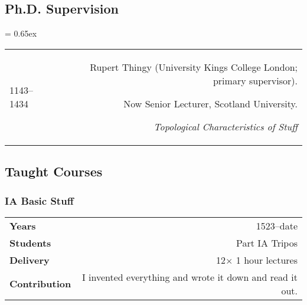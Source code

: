 \subsection{Ph.D. Supervision}

{
  \tabulinesep = 0.65ex

  \begin{longtabu} to 

      1143--1434 & Rupert Thingy (University Kings College London; primary supervisor).
      \par Now Senior Lecturer, Scotland University.
      \par\it Topological Characteristics of Stuff\\

    \end{longtabu}
  }

\subsection{Taught Courses}

\subsubsection{IA Basic Stuff}
\begin{longtabu} to 
  {\bf Years}
  & 1523--date\\

  {\bf Students}
  & Part IA Tripos\\

  {\bf Delivery}
  & 12$\times$ 1 hour lectures \\

  {\bf Contribution}
  & I invented everything and wrote it down and read it out. \\
\end{longtabu}


